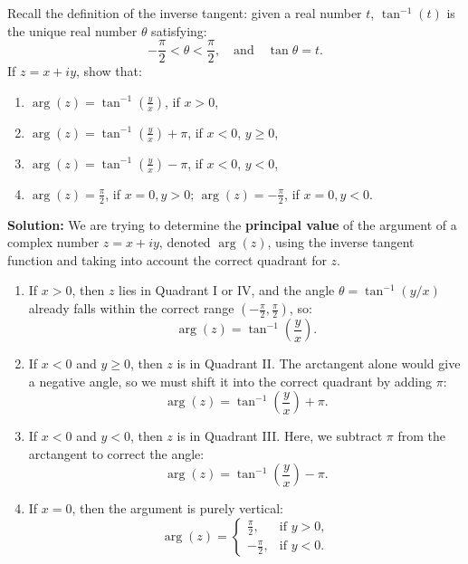 \begin{problembox}
Recall the definition of the inverse tangent: given a real number \( t \), \( \tan^{-1}(t) \) is the unique real number \( \theta \) satisfying:
\[
-\frac{\pi}{2} < \theta < \frac{\pi}{2}, \quad \text{and} \quad \tan \theta = t.
\]
If \( z = x + iy \), show that:
\begin{enumerate}[label=\alph*)]
\item \( \arg(z) = \tan^{-1}\left( \frac{y}{x} \right) \), if \( x > 0 \),
\item \( \arg(z) = \tan^{-1}\left( \frac{y}{x} \right) + \pi \), if \( x < 0 \), \( y \geq 0 \),
\item \( \arg(z) = \tan^{-1}\left( \frac{y}{x} \right) - \pi \), if \( x < 0 \), \( y < 0 \),
\item \( \arg(z) = \frac{\pi}{2} \), if \( x = 0, y > 0 \); \quad \( \arg(z) = -\frac{\pi}{2} \), if \( x = 0, y < 0 \).
\end{enumerate}
\end{problembox}

\textbf{Solution:}  
We are trying to determine the \textbf{principal value} of the argument of a complex number \( z = x + iy \), denoted \( \arg(z) \), using the inverse tangent function and taking into account the correct quadrant for \( z \).

\begin{enumerate}[label=\alph*)]

\item If \( x > 0 \), then \( z \) lies in Quadrant I or IV, and the angle \( \theta = \tan^{-1}(y/x) \) already falls within the correct range \( (-\frac{\pi}{2}, \frac{\pi}{2}) \), so:
\[
\arg(z) = \tan^{-1}\left( \frac{y}{x} \right).
\]

\item If \( x < 0 \) and \( y \geq 0 \), then \( z \) is in Quadrant II. The arctangent alone would give a negative angle, so we must shift it into the correct quadrant by adding \( \pi \):
\[
\arg(z) = \tan^{-1}\left( \frac{y}{x} \right) + \pi.
\]

\item If \( x < 0 \) and \( y < 0 \), then \( z \) is in Quadrant III. Here, we subtract \( \pi \) from the arctangent to correct the angle:
\[
\arg(z) = \tan^{-1}\left( \frac{y}{x} \right) - \pi.
\]

\item If \( x = 0 \), then the argument is purely vertical:
\[
\arg(z) =
\begin{cases}
\frac{\pi}{2}, & \text{if } y > 0, \\
-\frac{\pi}{2}, & \text{if } y < 0.
\end{cases}
\]

\end{enumerate}

